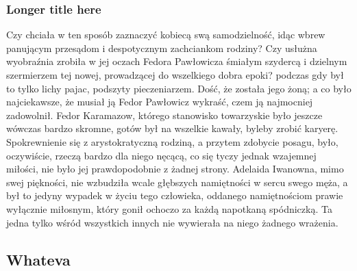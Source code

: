 \documentclass{article}
\begin{document}
\subsubsection[Short title here]{Longer title here}

Czy chciała w ten sposób zaznaczyć kobiecą swą samodzielność, idąc wbrew panującym przesądom i despotycznym zachciankom rodziny? Czy usłużna wyobraźnia zrobiła w jej oczach Fedora Pawłowicza śmiałym szydercą i dzielnym szermierzem tej nowej, prowadzącej do wszelkiego dobra epoki? podczas gdy był to tylko lichy pajac, podszyty pieczeniarzem. Dość, że została jego żoną; a co było najciekawsze, że musiał ją Fedor Pawłowicz wykraść, czem ją najmocniej zadowolnił.
Fedor Karamazow, którego stanowisko towarzyskie było jeszcze wówczas bardzo skromne, gotów był na wszelkie kawały, byleby zrobić karyerę. Spokrewnienie się z arystokratyczną rodziną, a przytem zdobycie posagu, było, oczywiście, rzeczą bardzo dla niego nęcącą, co się tyczy jednak wzajemnej miłości, nie było jej prawdopodobnie z żadnej strony. Adelaida Iwanowna, mimo swej piękności, nie wzbudziła wcale głębszych namiętności w sercu swego męża, a był to jedyny wypadek w życiu tego człowieka, oddanego namiętnościom prawie wyłącznie miłosnym, który gonił ochoczo za każdą napotkaną spódniczką. Ta jedna tylko wśród wszystkich innych nie wywierała na niego żadnego wrażenia.

\subsection{Whateva}
\end{document}
